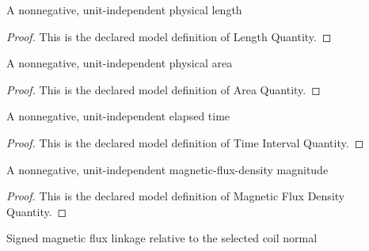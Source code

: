 \begin{definition}
  \label{def:physics:phyx-mini-0933:phyxminiproblems-problemphyxmini0933-lengthquantity}
  A nonnegative, unit-independent physical length
\end{definition}
\begin{proof}
  This is the declared model definition of Length Quantity.
\end{proof}
\begin{definition}
  \label{def:physics:phyx-mini-0933:phyxminiproblems-problemphyxmini0933-areaquantity}
  A nonnegative, unit-independent physical area
\end{definition}
\begin{proof}
  This is the declared model definition of Area Quantity.
\end{proof}
\begin{definition}
  \label{def:physics:phyx-mini-0933:phyxminiproblems-problemphyxmini0933-timeintervalquantity}
  A nonnegative, unit-independent elapsed time
\end{definition}
\begin{proof}
  This is the declared model definition of Time Interval Quantity.
\end{proof}
\begin{definition}
  \label{def:physics:phyx-mini-0933:phyxminiproblems-problemphyxmini0933-magneticfluxdensityquantity}
  A nonnegative, unit-independent magnetic-flux-density magnitude
\end{definition}
\begin{proof}
  This is the declared model definition of Magnetic Flux Density Quantity.
\end{proof}
\begin{definition}
  \label{def:physics:phyx-mini-0933:phyxminiproblems-problemphyxmini0933-signedmagneticfluxlinkagequantity}
  Signed magnetic flux linkage relative to the selected coil normal
\end{definition}
